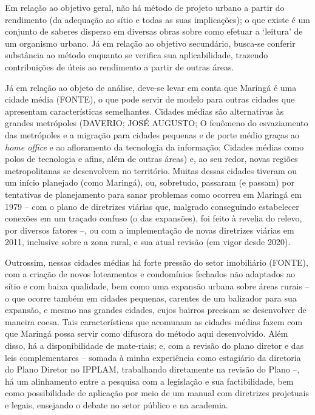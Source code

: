 \documentclass[twoside, 12pt, english,italian,latin,greek,french,spanish,brazil]{book}
\begin{document}
        Em relação ao objetivo geral, não há método de projeto urbano a partir do rendimento (da adequação ao sítio e todas as suas implicações); o que existe é um conjunto de saberes disperso em diversas obras sobre como efetuar a ‘leitura’ de um organismo urbano. Já em relação ao objetivo secundário, busca-se conferir substância ao método enquanto se verifica sua aplicabilidade, trazendo contribuições de úteis ao rendimento a partir de outras áreas.

        Já em relação ao objeto de análise, deve-se levar em conta que Maringá é uma cidade média (FONTE), o que pode servir de modelo para outras cidades que apresentam características semelhantes. Cidades médias são alternativas às grandes metrópoles (DAVERIO; JOSÉ AUGUSTO; O fenômeno do esvaziamento das metrópoles e a migração para cidades pequenas e de porte médio graças ao \textit{home office} e ao afloramento da tecnologia da informação; Cidades médias como polos de tecnologia e afins, além de outras áreas) e, ao seu redor, novas regiões metropolitanas se desenvolvem no território. Muitas dessas cidades tiveram ou um início planejado (como Maringá), ou, sobretudo, passaram (e passam) por tentativas de planejamento para sanar problemas  como ocorreu em Maringá em 1979 – com o plano de diretrizes viárias que, malgrado conseguindo estabelecer conexões em um traçado confuso (o das expansões), foi feito à revelia do relevo, por diversos fatores –, ou com a implementação de novas diretrizes viárias em 2011, inclusive sobre a zona rural, e sua atual revisão (em vigor desde 2020). 

        Outrossim, nessas cidades médias há forte pressão do setor imobiliário (FONTE), com a criação de novos loteamentos e condomínios fechados não adaptados ao sítio e com baixa qualidade, bem como uma expansão urbana sobre áreas rurais – o que ocorre também em cidades pequenas, carentes de um balizador para sua expansão, e mesmo nas grandes cidades, cujos bairros precisam se desenvolver de maneira coesa. Tais características que acomunam as cidades médias fazem com que Maringá possa servir como difusora do método aqui desenvolvido. Além disso, há a disponibilidade de mate-riais; e, com a revisão do plano diretor e das leis complementares – somada à minha experiência como estagiário da diretoria do Plano Diretor no IPPLAM, trabalhando diretamente na revisão do Plano –, há um alinhamento entre a pesquisa com a legislação e sua factibilidade, bem como possibilidade de aplicação por meio de um manual com diretrizes projetuais e legais, ensejando o debate no setor público e na academia.
\end{document}
